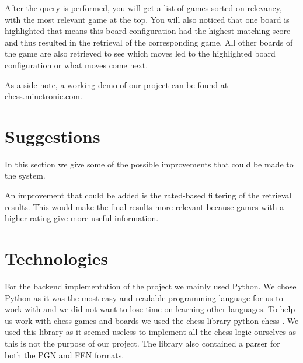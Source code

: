 \documentclass[11pt]{article}
\begin{document}
    After the query is performed, you will get a list of games sorted on relevancy, with the most relevant game at the top. You will also noticed that one board is highlighted that means this board configuration had the highest matching score and thus resulted in the retrieval of the corresponding game. All other boards of the game are also retrieved to see which moves led to the highlighted board configuration or what moves come next.

    As a side-note, a working demo of our project can be found at \href{http://chess.minetronic.com}{chess.minetronic.com}.


    \section{Suggestions}

    In this section we give some of the possible improvements that could be made to the system.

    An improvement that could be added is the rated-based filtering of the retrieval results. This would make the final results more relevant because games with a higher rating give more useful information.


    \section{Technologies}

    For the backend implementation of the project we mainly used Python. We chose Python as it was the most easy and readable programming language for us to work with and we did not want to lose time on learning other languages. To help us work with chess games and boards we used the chess library python-chess \cite{python-chess}. We used this library as it seemed useless to implement all the chess logic ourselves as this is not the purpose of our project. The library also contained a parser for both the PGN and FEN formats.

    

\end{document}
